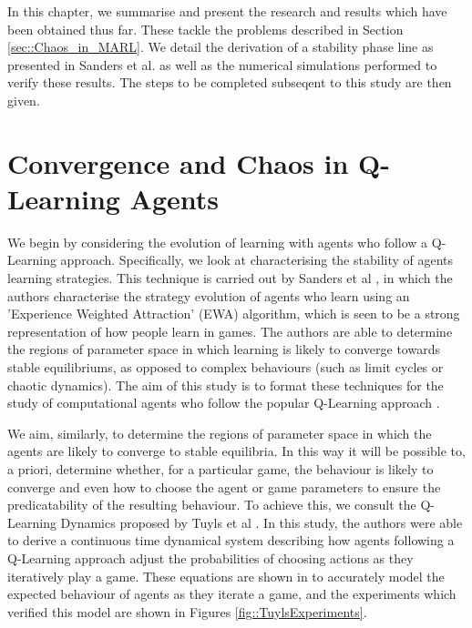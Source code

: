 \documentclass[.../main.tex]{subfiles}
\begin{document}
    In this chapter, we summarise and present the research and results which have been obtained thus
    far. These tackle the problems described in Section \ref{sec::Chaos_in_MARL}. We detail the
    derivation of a stability phase line as presented in Sanders et al. \cite{Sanders2018} as well
    as the numerical simulations performed to verify these results. The steps to be completed
    subseqent to this study are then given.

    \section{Convergence and Chaos in Q-Learning Agents} \label{sec::Chaos_in_Q-Learning}

    We begin by considering the evolution of learning with agents who follow a Q-Learning approach.
    Specifically, we look at characterising the stability of agents learning strategies. This
    technique is carried out by Sanders et al \cite{Sanders2018}, in which the authors
    characterise the strategy evolution of agents who learn using an 'Experience Weighted
    Attraction' (EWA) algorithm, which is seen to be a strong representation of how people learn in
    games. The authors are able to determine the regions of parameter space in which learning is
    likely to converge towards stable equilibriums, as opposed to complex behaviours (such as limit
    cycles or chaotic dynamics). The aim of this study is to format these techniques for the study
    of computational agents who follow the popular Q-Learning approach \cite{Sutton2018,SchwartzMulti-agentApproach}.

    We aim, similarly, to determine the regions of parameter space in which the agents are likely to
    converge to stable equilibria. In this way it will be possible to, a priori, determine whether,
    for a particular game, the behaviour is likely to converge and even how to choose the agent or
    game parameters to ensure the predicatability of the resulting behaviour. To achieve this, we
    consult the Q-Learning Dynamics proposed by Tuyls et al \cite{Tuyls2006AnGames}. In this study, the
    authors were able to derive a continuous time dynamical system describing how agents following a
    Q-Learning approach adjust the probabilities of choosing actions as they iteratively play a
    game. These equations are shown in \cite{Tuyls2006AnGames} to accurately model the expected
    behaviour of agents as they iterate a game, and the experiments which verified this model are
    shown in Figures \ref{fig::TuylsExperiments}. 
\end{document}
